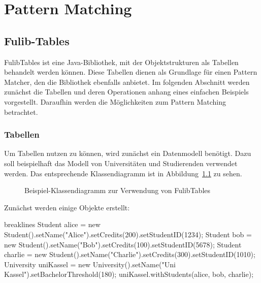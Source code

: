 \chapter{Pattern Matching}\label{ch:pattern-matching}


\section{Fulib-Tables}\label{sec:fulib-tables}

FulibTables\cite{fulibTables} ist eine Java-Bibliothek, mit der Objektstrukturen als Tabellen behandelt werden können.
Diese Tabellen dienen als Grundlage für einen Pattern Matcher, den die Bibliothek ebenfalls anbietet.
Im folgenden Abschnitt werden zunächst die Tabellen und deren Operationen anhang eines einfachen Beispiels vorgestellt.
Daraufhin werden die Möglichkeiten zum Pattern Matching betrachtet.

\subsection{Tabellen}\label{subsec:tables}

Um Tabellen nutzen zu können, wird zunächst ein Datenmodell benötigt.
Dazu soll beispielhaft das Modell von Universitäten und Studierenden verwendet werden.
Das entsprechende Klassendiagramm ist in Abbildung~\ref{fig:table-example-class-diagram} zu sehen.

\begin{figure}
    \caption{Beispiel-Klassendiagramm zur Verwendung von FulibTables}
    \label{fig:table-example-class-diagram}
\end{figure}

Zunächst werden einige Objekte erstellt:

\begin{jcodeblock*}{breaklines}
    Student alice = new Student().setName("Alice").setCredits(200).setStudentID(1234);
    Student bob = new Student().setName("Bob").setCredits(100).setStudentID(5678);
    Student charlie = new Student().setName("Charlie").setCredits(300).setStudentID(1010);
    University uniKassel = new University().setName("Uni Kassel").setBachelorThreshold(180);
    uniKassel.withStudents(alice, bob, charlie);
\end{jcodeblock*}

